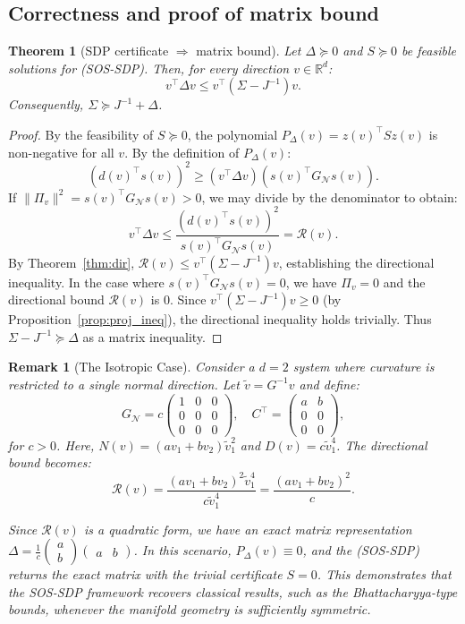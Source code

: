 \documentclass[pdflatex,sn-mathphys-num]{sn-jnl}%
\theoremstyle{thmstyleone}%
\newtheorem{theorem}{Theorem}%
\theoremstyle{thmstyletwo}%
\newtheorem{remark}{Remark}%
\theoremstyle{thmstylethree}%
\begin{document}
\subsection*{Correctness and proof of matrix bound}
\begin{theorem}[SDP certificate $\Rightarrow$ matrix bound]
\label{thm:sdp}
Let $\Delta \succeq 0$ and $S \succeq 0$ be feasible solutions for (SOS-SDP). Then, for every direction $v \in \mathbb{R}^d$:
\[
v^\top\Delta v \le v^\top(\Sigma-J^{-1})v.
\]
Consequently, $\Sigma \succeq J^{-1} + \Delta$.
\end{theorem}

\begin{proof}
By the feasibility of $S \succeq 0$, the polynomial $P_\Delta(v) = z(v)^\top S z(v)$ is non-negative for all $v$. By the definition of $P_\Delta(v)$:
\[
(d(v)^\top s(v))^2 \ge (v^\top\Delta v)(s(v)^\top G_{\mathcal{N}} s(v)).
\]
If $\|\Pi_v\|^2 = s(v)^\top G_{\mathcal{N}} s(v) > 0$, we may divide by the denominator to obtain:
\[
v^\top\Delta v \le \frac{(d(v)^\top s(v))^2}{s(v)^\top G_{\mathcal{N}} s(v)} = \mathcal{R}(v).
\]
By Theorem~\ref{thm:dir}, $\mathcal{R}(v) \le v^\top(\Sigma-J^{-1})v$, establishing the directional inequality. In the case where $s(v)^\top G_{\mathcal{N}} s(v) = 0$, we have $\Pi_v = 0$ and the directional bound \(\mathcal{R}(v)\) is $0$. Since $v^\top(\Sigma-J^{-1})v \ge 0$ (by Proposition~\ref{prop:proj_ineq}), the directional inequality holds trivially. Thus $\Sigma - J^{-1} \succeq \Delta$ as a matrix inequality.
\end{proof}

\begin{remark}[The Isotropic Case]
Consider a $d=2$ system where curvature is restricted to a single normal direction. Let $\tilde v = G^{-1} v$ and define:
\[
G_{\mathcal{N}} = c \begin{pmatrix} 1 & 0 & 0 \\ 0 & 0 & 0 \\ 0 & 0 & 0 \end{pmatrix}, \quad C^\top = \begin{pmatrix} a & b \\ 0 & 0 \\ 0 & 0 \end{pmatrix},
\]
for $c>0$. Here, $N(v) = (av_1 + bv_2)\tilde{v}_1^2$ and $D(v) = c\tilde{v}_1^4$. The directional bound becomes:
\[
\mathcal{R}(v) = \frac{(av_1 + bv_2)^2 \tilde{v}_1^4}{c \tilde{v}_1^4} = \frac{(av_1 + bv_2)^2}{c}.
\]

Since $\mathcal{R}(v)$ is a quadratic form, we have an exact matrix representation $\Delta = \frac{1}{c} \begin{pmatrix} a \\ b \end{pmatrix} \begin{pmatrix} a & b \end{pmatrix}$. In this scenario, $P_\Delta(v) \equiv 0$, and the (SOS-SDP) returns the exact matrix with the trivial certificate $S=0$. This demonstrates that the SOS-SDP framework recovers classical results, such as the Bhattacharyya-type bounds, whenever the manifold geometry is sufficiently symmetric.
\end{remark}
\end{document}

